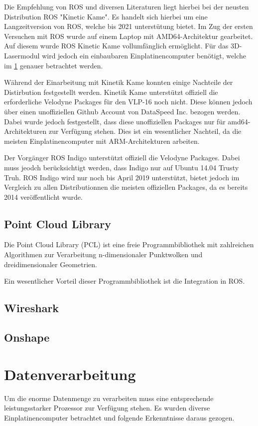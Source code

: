 Die Empfehlung von ROS und diversen Literaturen liegt hierbei bei der neusten Distribution ROS "Kinetic Kame". Es handelt sich hierbei um eine Langzeitversion von ROS, welche bis 2021 unterstütung bietet. Im Zug der ersten Versuchen mit ROS wurde auf einem Laptop mit AMD64-Architektur gearbeitet. Auf diesem wurde ROS Kinetic Kame vollumfänglich ermöglicht. Für das 3D-Lasermodul wird jedoch ein einbaubaren Einplatinencomputer benötigt, welche im \ref{sec:Datenverarbeitung} genauer betrachtet werden. 

Während der Einarbeitung mit Kinetik Kame konnten einige Nachteile der Distirbution festgestellt werden. Kinetik Kame unterstützt offiziell die erforderliche Velodyne Packages für den VLP-16 noch nicht. Diese können jedoch über einen unoffiziellen Github Account von DataSpeed Inc. bezogen werden. Dabei wurde jedoch festgestellt, dass diese unoffiziellen Packages nur für amd64-Architekturen zur Verfügung stehen. Dies ist ein wesentlicher Nachteil, da die meisten Einplatinencomputer mit ARM-Architekturen arbeiten.

Der Vorgänger ROS Indigo unterstützt offiziell die Velodyne Packages. Dabei muss jeodch berücksichtigt werden, dass Indigo nur auf Ubuntu 14.04 Trusty Truh. ROS Indigo wird nur noch bis April 2019 unterstützt, bietet jedoch im Vergleich zu allen Distributionnen die meisten offiziellen Packages, da es bereits 2014 veröffentlicht wurde.

\subsection{Point Cloud Library}
\label{subse:PointCloudLibrary}
Die Point Cloud Library (PCL) ist eine freie Programmbibliothek mit zahlreichen Algorithmen zur Verarbeitung n-dimensionaler Punktwolken und dreidimensionaler Geometrien.

Ein wesentlicher Vorteil dieser Programmbibliothek ist die Integration in ROS.
\subsection{Wireshark}
\label{subcec_Wirehark}
\subsection{Onshape}
\label{subsec:OnShape}

\section{Datenverarbeitung}
\label{sec:Datenverarbeitung}
Um die enorme Datenmenge zu verarbeiten muss eine entsprechende leistungsstarker Prozessor zur Verfügung stehen. Es wurden diverse Einplatinencomputer betrachtet und folgende Erkenntnisse daraus gezogen.

